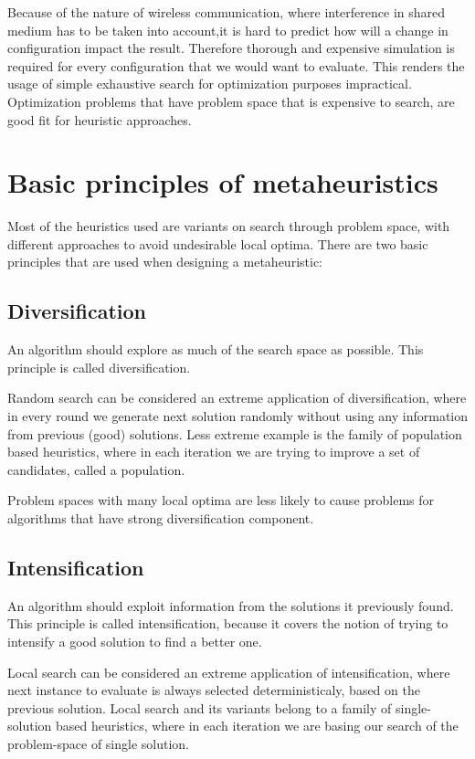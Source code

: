 \documentclass[12pt,oneside]{fithesis2}
\begin{document}
Because of the nature of wireless communication, where interference in shared medium has to be taken into account,it is hard to predict how will a change in configuration impact the result. Therefore thorough and expensive simulation is required for every configuration that we would want to evaluate. This renders the usage of simple exhaustive search for optimization purposes impractical. Optimization problems that have problem space that is expensive to search, are good fit for heuristic approaches\cite{talbi2009metaheuristics}. 

\section{Basic principles of metaheuristics}

Most of the heuristics used are variants on search through problem space, with different approaches to avoid undesirable local optima.
There are two basic principles that are used when designing a metaheuristic\cite{talbi2009metaheuristics}:

\subsection{Diversification}
An algorithm should explore as much of the search space as possible. This principle is called diversification.

Random search can be considered an extreme application of diversification, where in every round we generate next solution randomly without using any information from previous (good) solutions. Less extreme example is the family of population based heuristics, where in each iteration we are trying to improve a set of candidates, called a population.

Problem spaces with many local optima are less likely to cause problems for algorithms that have strong diversification component.

\subsection{Intensification} 
An algorithm should exploit information from the solutions it previously found. This principle is called intensification, because it covers the notion of trying to intensify a good solution to find a better one.

Local search can be considered an extreme application of intensification, where next instance to evaluate is always selected deterministicaly, based on the previous solution. Local search and its variants belong to a family of single-solution based heuristics, where in each iteration we are basing our search of the problem-space of single solution.
\end{document}
